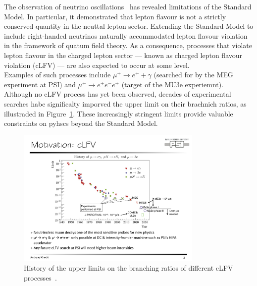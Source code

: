 The observation of neutrino oscillations~\cite{} has revealed limitations of the Standard Model. In particular, it demonstrated that lepton flavour is not a strictly conserved quantity in the neuttal lepton sector. 
Extending the Standard Model to include right-handed neutrinos naturally accommodated lepton flavour violation in the framework of quatum field theory. 
As a consequence, processes that violate lepton flavour in the charged lepton sector --- known as charged lepton flavour violation (cLFV) --- are also expected to occur at some level. 
\\
Examples of such processes include $\mu^+ \to e^+ + \gamma$ (searched for by the MEG experiment at PSI) and $\mu^+ \to e^+ e^- e^+$ (target of the MU3e experiemnt). 
Although no cLFV process has yet been observed, decades of experimental searches habe significalty imporved the upper limit on their brachnich ratios, as illustraded in Figure~\ref{fig:clfv_history}. 
These increasingly stringent limits provide valuable constraints on pyhscs beyond the Standard Model. 
\begin{figure}
    \centering
    \includegraphics[width=0.8\textwidth]{figures/cLFV_history.pdf}
    \caption{History of the upper limits on the branching ratios of different cLFV processes~\cite{aiba2021science}.}\label{fig:clfv_history}
\end{figure}